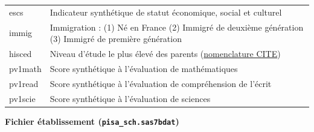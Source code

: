 \documentclass[12pt,twosided, notitlepage]{book}
\begin{document}
\begin{longtable}[]{@{}ll@{}}
\begin{minipage}[t]{0.38\columnwidth}\raggedright
escs\strut
\end{minipage} & \begin{minipage}[t]{0.56\columnwidth}\raggedright
Indicateur synthétique de statut économique, social et culturel\strut
\end{minipage}\tabularnewline
\begin{minipage}[t]{0.38\columnwidth}\raggedright
immig\strut
\end{minipage} & \begin{minipage}[t]{0.56\columnwidth}\raggedright
Immigration : (1) Né en France (2) Immigré de deuxième génération (3)
Immigré de première génération\strut
\end{minipage}\tabularnewline
\begin{minipage}[t]{0.38\columnwidth}\raggedright
hisced\strut
\end{minipage} & \begin{minipage}[t]{0.56\columnwidth}\raggedright
Niveau d'étude le plus élevé des parents
(\href{http://www.uis.unesco.org/Education/Documents/isced-2011-fr.pdf}{nomenclature
CITE})\strut
\end{minipage}\tabularnewline
\begin{minipage}[t]{0.38\columnwidth}\raggedright
pv1math\strut
\end{minipage} & \begin{minipage}[t]{0.56\columnwidth}\raggedright
Score synthétique à l'évaluation de mathématiques\strut
\end{minipage}\tabularnewline
\begin{minipage}[t]{0.38\columnwidth}\raggedright
pv1read\strut
\end{minipage} & \begin{minipage}[t]{0.56\columnwidth}\raggedright
Score synthétique à l'évaluation de compréhension de l'écrit\strut
\end{minipage}\tabularnewline
\begin{minipage}[t]{0.38\columnwidth}\raggedright
pv1scie\strut
\end{minipage} & \begin{minipage}[t]{0.56\columnwidth}\raggedright
Score synthétique à l'évaluation de sciences\strut
\end{minipage}\tabularnewline
\bottomrule
\end{longtable}

\textbf{Fichier établissement (\texttt{pisa\_sch.sas7bdat})}
\end{document}
